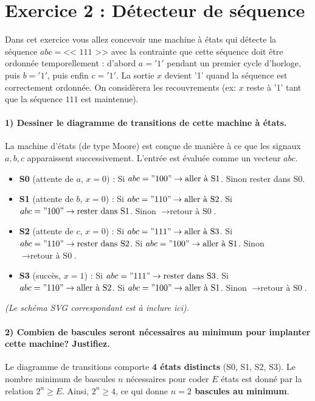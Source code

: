 \documentclass[11pt,a4paper]{article}
\begin{document}
\vspace{1cm}

\section*{Exercice 2 : Détecteur de séquence}

Dans cet exercice vous allez concevoir une machine à états qui détecte la séquence $abc= \text{<< } 111 \text{ >>}$ avec la contrainte que cette séquence doit être ordonnée temporellement : d'abord $a='1'$ pendant un premier cycle d'horloge, puis $b='1'$, puis enfin $c='1'$. La sortie $x$ devient '1' quand la séquence est correctement ordonnée. On considèrera les recouvrements (ex: $x$ reste à '1' tant que la séquence $111$ est maintenue).

\paragraph{1) Dessiner le diagramme de transitions de cette machine à états.}
La machine d'états (de type Moore) est conçue de manière à ce que les signaux $a, b, c$ apparaissent successivement. L'entrée est évaluée comme un vecteur $abc$.
\begin{itemize}
    \item \textbf{S0} (attente de $a$, $x=0$) : Si $abc = "100" \rightarrow \text{aller à S1}$. Sinon rester dans S0.
    \item \textbf{S1} (attente de $b$, $x=0$) : Si $abc = "110" \rightarrow \text{aller à S2}$. Si $abc = "100" \rightarrow \text{rester dans S1}$. Sinon $\rightarrow \text{retour à S0}$.
    \item \textbf{S2} (attente de $c$, $x=0$) : Si $abc = "111" \rightarrow \text{aller à S3}$. Si $abc = "110" \rightarrow \text{rester dans S2}$. Si $abc = "100" \rightarrow \text{aller à S1}$. Sinon $\rightarrow \text{retour à S0}$.
    \item \textbf{S3} (succès, $x=1$) : Si $abc = "111" \rightarrow \text{rester dans S3}$. Si $abc = "110" \rightarrow \text{aller à S2}$. Si $abc = "100" \rightarrow \text{aller à S1}$. Sinon $\rightarrow \text{retour à S0}$.
\end{itemize}
\textit{(Le schéma SVG correspondant est à inclure ici).}

\paragraph{2) Combien de bascules seront nécessaires au minimum pour implanter cette machine? Justifiez.}
Le diagramme de transitions comporte \textbf{4 états distincts} (S0, S1, S2, S3). Le nombre minimum de bascules $n$ nécessaires pour coder $E$ états est donné par la relation $2^n \ge E$. Ainsi, $2^n \ge 4$, ce qui donne \textbf{$n = 2$ bascules au minimum}.
\end{document}

